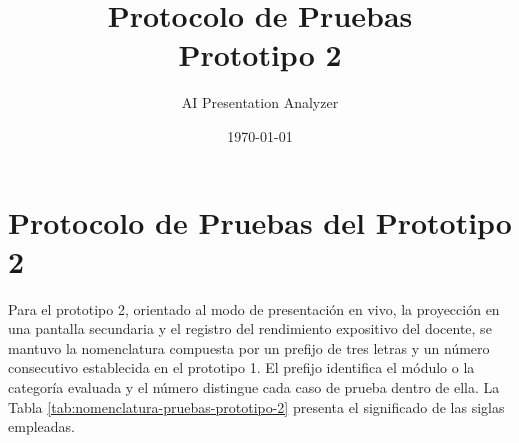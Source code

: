 \documentclass[12pt,letterpaper]{article}
\title{\textbf{Protocolo de Pruebas\\[0.3em]Prototipo 2}}
\author{AI Presentation Analyzer}
\date{\today}
\begin{document}
\maketitle

\section*{Protocolo de Pruebas del Prototipo 2}

Para el prototipo 2, orientado al modo de presentación en vivo, la proyección en una pantalla secundaria y el registro del rendimiento expositivo del docente, se mantuvo la nomenclatura compuesta por un prefijo de tres letras y un número consecutivo establecida en el prototipo 1. El prefijo identifica el módulo o la categoría evaluada y el número distingue cada caso de prueba dentro de ella. La Tabla \ref{tab:nomenclatura-pruebas-prototipo-2} presenta el significado de las siglas empleadas.
\end{document}
